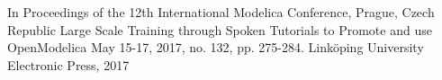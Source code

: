 \begin{cventries}

  \cventry
    {In Proceedings of the 12th International Modelica Conference, Prague, Czech Republic} %
    {Large Scale Training through Spoken Tutorials to Promote and use OpenModelica} %
    {May 15-17, 2017, no. 132, pp. 275-284.} %
    {Linköping University Electronic Press, 2017} %
    {
    }

\end{cventries}
